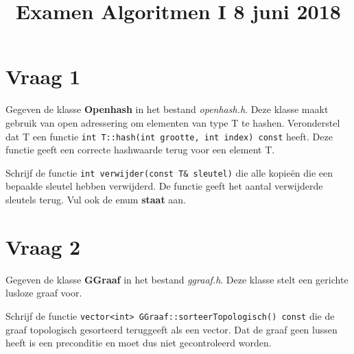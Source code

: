 \documentclass{article}
\begin{document}
\title{Examen Algoritmen I 8 juni 2018}
\date{}
\author{}
\maketitle

\section{Vraag 1}
    Gegeven de klasse \textbf{Openhash} in het bestand \textit{openhash.h}. Deze klasse maakt gebruik van open adressering om elementen van type T te hashen. Veronderstel dat T een functie \texttt{int T::hash(int grootte, int index) const} heeft. Deze functie geeft een correcte hashwaarde terug voor een element T. 
    
    Schrijf de functie \texttt{int verwijder(const T\& sleutel)} die alle kopie\"en die een bepaalde sleutel hebben verwijderd. De functie geeft het aantal verwijderde sleutels terug. Vul ook de enum \textbf{staat} aan.

\section{Vraag 2}
    Gegeven de klasse \textbf{GGraaf} in het bestand \textit{ggraaf.h}. Deze klasse stelt een gerichte lusloze graaf voor.
    
    Schrijf de functie \texttt{vector<int> GGraaf::sorteerTopologisch() const} die de graaf topologisch gesorteerd teruggeeft als een vector. Dat de graaf geen lussen heeft is een preconditie en moet dus niet gecontroleerd worden.
\end{document}
